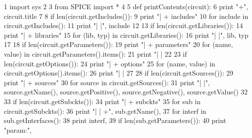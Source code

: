 \begin{DoxyCodeInclude}
1 \textcolor{keyword}{import} sys
2 
3 \textcolor{keyword}{from} SPICE \textcolor{keyword}{import} *
4 
5 \textcolor{keyword}{def }printContents(circuit):
6   \textcolor{keywordflow}{print} \textcolor{stringliteral}{"+"}, circuit.title
7 
8   \textcolor{keywordflow}{if} len(circuit.getIncludes()):
9     \textcolor{keywordflow}{print} \textcolor{stringliteral}{"| + includes"}
10     \textcolor{keywordflow}{for} include \textcolor{keywordflow}{in} circuit.getIncludes():
11       \textcolor{keywordflow}{print} \textcolor{stringliteral}{"| |"}, include
12 
13   \textcolor{keywordflow}{if} len(circuit.getLibraries()):
14     \textcolor{keywordflow}{print} \textcolor{stringliteral}{"| + libraries"}
15     \textcolor{keywordflow}{for} (lib, typ) \textcolor{keywordflow}{in} circuit.getLibraries():
16       \textcolor{keywordflow}{print} \textcolor{stringliteral}{"| |"}, lib, typ
17 
18   \textcolor{keywordflow}{if} len(circuit.getParameters()):
19     \textcolor{keywordflow}{print} \textcolor{stringliteral}{"| + parameters"}
20     \textcolor{keywordflow}{for} (name, value) \textcolor{keywordflow}{in} circuit.getParameters().items():
21       \textcolor{keywordflow}{print} \textcolor{stringliteral}{"| | %
22 
23   \textcolor{keywordflow}{if} len(circuit.getOptions()):
24     \textcolor{keywordflow}{print} \textcolor{stringliteral}{"| + options"}
25     \textcolor{keywordflow}{for} (name, value) \textcolor{keywordflow}{in} circuit.getOptions().items():
26       \textcolor{keywordflow}{print} \textcolor{stringliteral}{"| | %
27 
28   \textcolor{keywordflow}{if} len(circuit.getSources()):
29     \textcolor{keywordflow}{print} \textcolor{stringliteral}{"| + sources"}
30     \textcolor{keywordflow}{for} source \textcolor{keywordflow}{in} circuit.getSources():
31       \textcolor{keywordflow}{print} \textcolor{stringliteral}{"| |"}, source.getName(), source.getPositive(), source.getNegative(), source.getValue()
32 
33   \textcolor{keywordflow}{if} len(circuit.getSubckts()):
34     \textcolor{keywordflow}{print} \textcolor{stringliteral}{"| + subckts"}
35     \textcolor{keywordflow}{for} sub \textcolor{keywordflow}{in} circuit.getSubckts():
36       \textcolor{keywordflow}{print} \textcolor{stringliteral}{"| | +"}, sub.getName(),
37       \textcolor{keywordflow}{for} interf \textcolor{keywordflow}{in} sub.getInterfaces():
38         \textcolor{keywordflow}{print} interf,
39       \textcolor{keywordflow}{if} len(sub.getParameters()):
40           \textcolor{keywordflow}{print} \textcolor{stringliteral}{"param:"},
}}
\end{DoxyCodeInclude}
